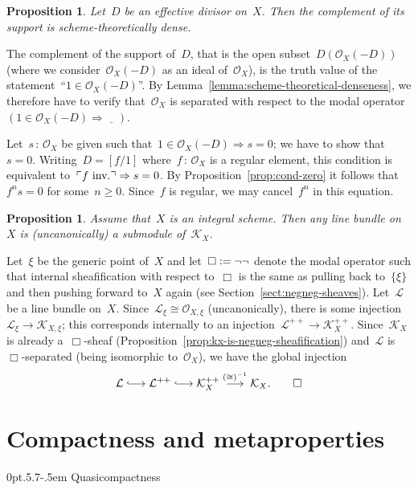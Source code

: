 \documentclass[10pt,reqno,a4paper]{amsbook}
\makeatletter
\theoremstyle{definition}
\theoremstyle{plain}
\newtheorem{prop}[defn]{Proposition}
\theoremstyle{remark}
\renewcommand{\O}{\mathcal{O}}
\newcommand{\K}{\mathcal{K}}
\renewcommand{\L}{\mathcal{L}}
\newcommand{\placeholder}{\underline{\quad}}
\newcommand{\?}{\,{:}\,}
\renewcommand{\_}{\mathpunct{.}\,}
\newcommand{\speak}[1]{\ulcorner\text{\textnormal{#1}}\urcorner}
\newcommand{\lhra}{\ensuremath{\lhook\joinrel\relbar\joinrel\rightarrow}}
\newcommand{\inv}{inv.\@}
\newcommand{\defeq}{\vcentcolon=}
\renewenvironment{proof}[1][\proofname]{\par
  \pushQED{\qed}%
  \normalfont \topsep6\p@\@plus6\p@\relax
  \trivlist
  \item[\hskip\labelsep
        \itshape
    #1\@addpunct{.}]\ignorespaces
}{%
  \popQED\endtrivlist\@endpefalse
}
\def\subsection{\@startsection{subsection}{2}%
  {0pt}{.5\linespacing\@plus.7\linespacing}{-.5em}%
  {\normalfont\bfseries}}
\makeatother
\begin{document}
\begin{prop}Let~$D$ be an effective divisor on~$X$. Then the complement of its
support is scheme-theoretically dense.\end{prop}
\begin{proof}The complement of the support of~$D$, that is the open
subset~$D(\O_X(-D))$ (where we consider~$\O_X(-D)$ as an ideal of~$\O_X$), is
the truth value of the statement~``$1 \in \O_X(-D)$''. By
Lemma~\ref{lemma:scheme-theoretical-denseness}, we therefore have to verify
that~$\O_X$ is separated with respect to the modal operator~$(1 \in \O_X(-D)
\Rightarrow \placeholder)$.

Let~$s \? \O_X$ be given such that~$1 \in \O_X(-D) \Rightarrow s = 0$; we have
to show that~$s = 0$. Writing~$D = [f/1]$ where~$f \? \O_X$ is a regular
element, this condition is equivalent to~$\speak{$f$ \inv} \Rightarrow s = 0$.
By Proposition~\ref{prop:cond-zero} it follows that~$f^n s = 0$ for some~$n
\geq 0$. Since~$f$ is regular, we may cancel~$f^n$ in this equation.
\end{proof}

\begin{prop}Assume that~$X$ is an integral scheme. Then any line bundle on~$X$
is (uncanonically) a submodule of~$\K_X$.\end{prop}
\begin{proof}Let~$\xi$ be the generic point of~$X$ and let~$\Box \defeq \neg\neg$
denote the modal operator such that internal sheafification with respect
to~$\Box$ is the same as pulling back to~$\{\xi\}$ and then pushing forward
to~$X$ again (see Section~\ref{sect:negneg-sheaves}). Let~$\L$ be a line bundle on~$X$. Since~$\L_\xi \cong
\O_{X,\xi}$ (uncanonically), there is some injection~$\L_\xi \to \K_{X,\xi}$;
this corresponds internally to an injection~$\L^{++} \to \K_X^{++}$.
Since~$\K_X$ is already a~$\Box$-sheaf
(Proposition~\ref{prop:kx-is-negneg-sheafification}) and~$\L$ is~$\Box$-separated
(being isomorphic to~$\O_X$), we have the global injection
\[ \L \lhra \L^{++} \lhra \K_X^{++} \stackrel{({\cong})^{-1}}{\longrightarrow} \K_X. \qedhere \]
\end{proof}


\section{Compactness and metaproperties}
\label{sect:compactness}

\subsection{Quasicompactness}
\end{document}
